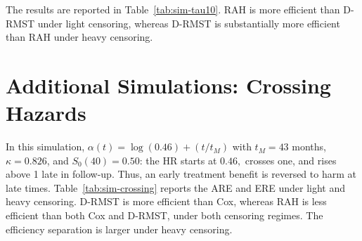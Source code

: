 \documentclass[12pt]{article}
\begin{document}
The results are reported in Table~\ref{tab:sim-tau10}. RAH is more efficient than D-RMST under light censoring, whereas D-RMST is substantially more efficient than RAH under heavy censoring.

\begin{table}[ht]
\centering
\caption{ARE and ERE under PH (HR$=0.70$), $\tau=10$, $n=150$ per arm, $B=500$.}
\label{tab:sim-tau10}
\end{table}

\section{Additional Simulations: Crossing Hazards}
\label{sec:appendix-crossing}



In this simulation, $\alpha(t)=\log(0.46)+(t/t_M)$ with $t_M=43$ months,
$\kappa=0.826$, and $S_0(40)=0.50$: the HR starts at $0.46,$ crosses one, and rises above 1 late in follow-up. Thus, an early treatment benefit is reversed to harm at late times.
Table~\ref{tab:sim-crossing} reports the ARE and ERE under light and heavy censoring. D-RMST is more efficient than Cox, whereas RAH is less efficient than both Cox and D-RMST, under both censoring regimes. The efficiency separation is larger under heavy censoring.
\end{document}
